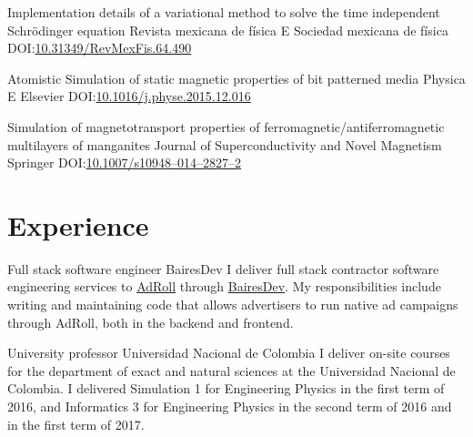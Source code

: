 \documentclass[12pt,english]{moderncv}
\begin{document}
        {%
            Implementation details of a variational method to solve the time
            independent Schrödinger equation%
        }
        {Revista mexicana de física E}
        {Sociedad mexicana de física}
        {}
        {DOI:\@ \href{https://doi.org/10.31349/RevMexFis.64.490}{10.31349/RevMexFis.64.490}}

        {Atomistic Simulation of static magnetic properties of bit patterned media}
        {Physica E}
        {Elsevier}
        {}
        {DOI:\@ \href{https://doi.org/10.1016/j.physe.2015.12.016}{10.1016/j.physe.2015.12.016}}

        {%
            Simulation of magnetotransport properties of
            ferromagnetic/antiferromagnetic multilayers of manganites%
        }
        {Journal of Superconductivity and Novel Magnetism}
        {Springer}
        {}
        {DOI:\@ \href{https://doi.org/10.1007/s10948-014-2827-2}{10.1007/s10948--014--2827--2}}


\section{Experience}

        {Full stack software engineer}
        {BairesDev}
        {}
        {}
        {%
            I deliver full stack contractor software engineering services to
            \href{https://www.adroll.com/}{AdRoll} through
            \href{http://www.bairesdev.com/}{BairesDev}. My responsibilities
            include writing and maintaining code that allows advertisers to run
            native ad campaigns through AdRoll, both in the backend and
            frontend.
        }

        {University professor}
        {Universidad Nacional de Colombia}
        {}
        {}
        {%
            I deliver on-site courses for the department of exact and natural
            sciences at the Universidad Nacional de Colombia. I delivered
            Simulation 1 for Engineering Physics in the first term of 2016, and
            Informatics 3 for Engineering Physics in the second term of 2016
            and in the first term of 2017.
        }
\end{document}
